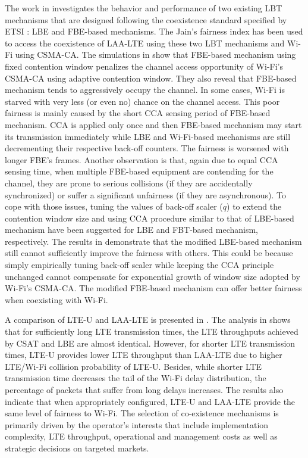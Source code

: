 \documentclass[12pt,onecolumn]{article}
\begin{document}
The work in \cite{Enhanced-LTE-U-thesis-2015} investigates the behavior and performance of two existing LBT mechanisms that are designed following the coexistence standard specified by ETSI \cite{LBT-ETSI-2014}: LBE and FBE-based mechanisms. The Jain's fairness index has been used to access the coexistence of LAA-LTE using these two LBT mechanisms and Wi-Fi using CSMA-CA. The simulations in \cite{Enhanced-LTE-U-thesis-2015} show that FBE-based mechanism using fixed contention window penalizes the channel access opportunity of Wi-Fi's CSMA-CA using adaptive contention window. They also reveal that FBE-based mechanism tends to aggressively occupy the channel. In some cases, Wi-Fi is starved with very less (or even no) chance on the channel access. This poor fairness is mainly caused by the short CCA sensing period of FBE-based mechanism. CCA is applied only once and then FBE-based mechanism may start its transmission immediately while LBE and Wi-Fi-based mechanisms are still decrementing their respective back-off counters. The fairness is worsened with longer FBE's frames. Another observation is that, again due to equal CCA sensing time, when multiple FBE-based equipment are contending for the channel, they are prone to serious collisions (if they are accidentally synchronized) or suffer a significant unfairness (if they are asynchronous). To cope with those issues, tuning the values of back-off scaler ($q$) to extend the contention window size and using CCA procedure similar to that of LBE-based mechanism have been suggested for LBE and FBT-based mechanism, respectively. The results in \cite{Enhanced-LTE-U-thesis-2015} demonstrate that the modified LBE-based mechanism still cannot sufficiently improve the fairness with others. This could be because simply empirically tuning back-off scaler while keeping the CCA principle unchanged cannot compensate for exponential growth of window size adopted by Wi-Fi's CSMA-CA. The modified FBE-based mechanism can offer better fairness when coexisting with Wi-Fi.

A comparison of LTE-U and LAA-LTE is presented in \cite{LBT-CSAT-2015}. The analysis in \cite{LBT-CSAT-2015} shows that for sufficiently long LTE transmission times, the LTE throughputs achieved by CSAT and LBE are almost identical. However, for shorter LTE transmission times, LTE-U provides lower LTE throughput than LAA-LTE due to higher LTE/Wi-Fi collision probability of LTE-U. Besides, while shorter LTE transmission time decreases the tail of the Wi-Fi delay distribution, the percentage of packets that suffer from long delays increases. The results also indicate that when appropriately configured, LTE-U and LAA-LTE provide the same level of fairness to Wi-Fi. The selection of co-existence mechanisms is primarily driven by the operator's interests that include implementation complexity, LTE throughput, operational and management costs as well as strategic decisions on targeted markets.
\end{document}
